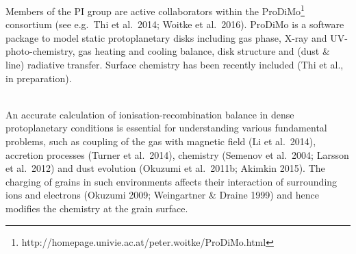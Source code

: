 \documentclass[10pt,fleqn,twoside]{article}
\begin{document}
Members of the PI group are active collaborators within the ProDiMo\footnote{http://homepage.univie.ac.at/peter.woitke/ProDiMo.html} consortium (see e.g.\ Thi et al.\ 2014; Woitke et al.\ 2016).  ProDiMo is a software package to model static protoplanetary disks including gas phase, X-ray and UV-photo-chemistry, gas heating and cooling balance, disk structure and (dust \& line) radiative transfer. Surface chemistry has been recently included (Thi et al., in preparation).

\vspace{0.5em}\\
An accurate calculation of ionisation-recombination balance in dense protoplanetary conditions is essential for
understanding various fundamental problems, such as coupling of the gas with magnetic field (Li et al.\ 2014), accretion
processes (Turner et al.\ 2014), chemistry (Semenov et al.\ 2004; Larsson et al.\ 2012) and dust evolution (Okuzumi et al.\ 2011b; Akimkin 2015). The charging of grains in such environments affects their interaction of surrounding ions and electrons
(Okuzumi 2009; Weingartner \& Draine 1999) and hence modifies the chemistry at the grain surface.
\end{document}
